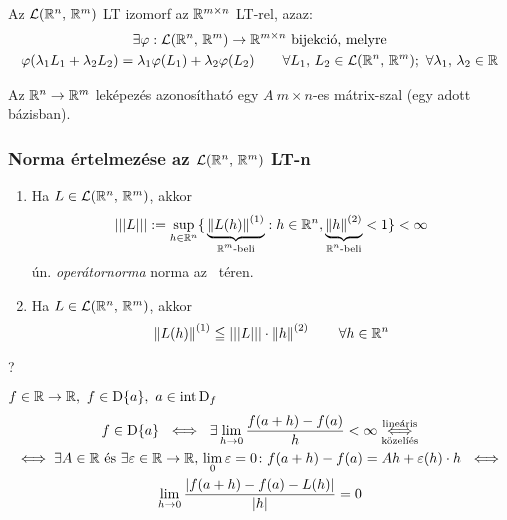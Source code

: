 \begin{te}
  Az $\mathcal{L}(\mathbb{R}^n,\,\mathbb{R}^m)$ LT izomorf  az $\mathbb{R}^{m\times n}$ LT-rel, azaz: 
  \begin{gather*}
    \exists \varphi: \mathcal{L}(\mathbb{R}^n,\,\mathbb{R}^m)\to\mathbb{R}^{m\times n} \text{ bijekció, melyre}\\
    \varphi(\lambda_1 L_1+\lambda_2 L_2) = \lambda_1\varphi(L_1) + \lambda_2 \varphi(L_2)
    \qquad \forall L_1,\,L_2\in\mathcal{L}(\mathbb{R}^n,\,\mathbb{R}^m);\ \forall \lambda_1,\,\lambda_2\in\mathbb{R}
  \end{gather*}
\end{te}

\begin{megj}
  Az $\mathbb{R}^n\to\mathbb{R}^m$ leképezés azonosítható egy $A\ m\times n$-es mátrix-szal (egy adott bázisban).
\end{megj}

\subsubsection{Norma értelmezése az $\mathcal{L}(\mathbb{R}^n,\,\mathbb{R}^m)$ LT-n}

\begin{te}
  \begin{enumerate}
    \item Ha $L\in\mathcal{L}(\mathbb{R}^n,\,\mathbb{R}^m)$, akkor 
      \[\displaystyle |||L||| := \sup_{h\in\mathbb{R}^n}\{\,\underbrace{\left\Vert L(h)\right\Vert^{(1)}}_{\text{$\mathbb{R}^m$-beli}} : h\in\mathbb{R}^n,
      \underbrace{\left\Vert h\right\Vert^{(2)}}_{\text{$\mathbb{R}^n$-beli}}<1\} < \infty\]
      ún. \emph{operátornorma} norma az \Linearis\ téren.
      \item Ha $L\in\mathcal{L}(\mathbb{R}^n,\,\mathbb{R}^m)$, akkor
	\[ \left\Vert L(h)\right\Vert^{(1)} \leqq |||L|||\cdot\left\Vert h\right\Vert^{(2)}\qquad\forall h\in\mathbb{R}^n 
	\]
  \end{enumerate}
\end{te}

\begin{biz}?\end{biz}

\begin{megj}
  $f\in\R\n\R,\  f\in\D\{a\},\ a\in\intD_f$
  \begin{gather*}\displaystyle
    f\in\operatorname{D}\{a\} \ \iff\  \exists \lim_{h\to0} \dfrac {f(a+h)-f(a)}{h} < \infty \overset{\text{lineáris}}{\underset
      {\text{közelíés}}{\iff}}\\\iff \exists A\in \mathbb{R} \text{ és } \exists \varepsilon \in \mathbb{R}\to\mathbb{R},\, \lim_0\varepsilon=0
    \colon f(a+h) -f(a) = Ah + \varepsilon(h)\cdot h \ \iff\\
    \lim_{h\to0}\dfrac{|f(a+h)-f(a)-L(h)|}{|h|} = 0
  \end{gather*}
\end{megj}



